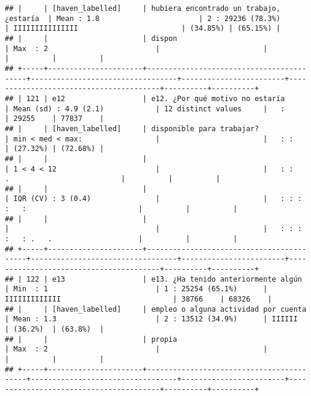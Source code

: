 \documentclass[]{article}
\begin{document}
\begin{verbatim}
## |     | [haven_labelled]     | hubiera encontrado un trabajo, ¿estaría  | Mean : 1.8                       | 2 : 29236 (78.3%)      | IIIIIIIIIIIIIII                        | (34.85%) | (65.15%) |
## |     |                      | dispon                                   | Max  : 2                         |                        |                                        |          |          |
## +-----+----------------------+------------------------------------------+----------------------------------+------------------------+----------------------------------------+----------+----------+
## | 121 | e12                  | e12. ¿Por qué motivo no estaría          | Mean (sd) : 4.9 (2.1)            | 12 distinct values     |   :                                    | 29255    | 77837    |
## |     | [haven_labelled]     | disponible para trabajar?                | min < med < max:                 |                        |   : :                                  | (27.32%) | (72.68%) |
## |     |                      |                                          | 1 < 4 < 12                       |                        |   : :       .                          |          |          |
## |     |                      |                                          | IQR (CV) : 3 (0.4)               |                        |   : : : :   :                          |          |          |
## |     |                      |                                          |                                  |                        |   : : : :   : .   .                    |          |          |
## +-----+----------------------+------------------------------------------+----------------------------------+------------------------+----------------------------------------+----------+----------+
## | 122 | e13                  | e13. ¿Ha tenido anteriormente algún      | Min  : 1                         | 1 : 25254 (65.1%)      | IIIIIIIIIIIII                          | 38766    | 68326    |
## |     | [haven_labelled]     | empleo o alguna actividad por cuenta     | Mean : 1.3                       | 2 : 13512 (34.9%)      | IIIIII                                 | (36.2%)  | (63.8%)  |
## |     |                      | propia                                   | Max  : 2                         |                        |                                        |          |          |
## +-----+----------------------+------------------------------------------+----------------------------------+------------------------+----------------------------------------+----------+----------+

\end{verbatim}
\end{document}
